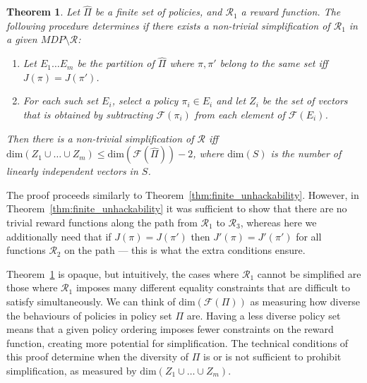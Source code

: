 \documentclass{article}
\newtheorem{theorem}{Theorem}
\theoremstyle{definition}
\theoremstyle{remark}
\begin{document}
\begin{theorem}\label{thm:finite_simplification}
Let $\hat{\Pi}$ be a finite set of policies, and $\mathcal{R}_1$ a reward function. The following procedure determines if there exists a non-trivial simplification of $\mathcal{R}_1$ in a given $MDP \setminus \mathcal{R}$:
\begin{enumerate}
    \item Let $E_1 \dots E_m$ be the partition of $\hat{\Pi}$ where $\pi,\pi'$ belong to the same set iff $J(\pi) = J(\pi')$.
    \item For each such set $E_i$, select a policy $\pi_i \in E_i$ and let $Z_i$ be the set of vectors that is obtained by subtracting $\mathcal{F}(\pi_i)$ from each element of $\mathcal{F}(E_i)$.
\end{enumerate}
Then there is a non-trivial simplification of $\mathcal{R}$ iff $\mathrm{dim}(Z_1 \cup \dots \cup Z_m) \leq \mathrm{dim}(\mathcal{F}(\hat{\Pi})) - 2$, where $\mathrm{dim}(S)$ is the number of linearly independent vectors in $S$.
\end{theorem}



The proof proceeds similarly to Theorem~\ref{thm:finite_unhackability}. However, in Theorem~\ref{thm:finite_unhackability} it was sufficient to show that there are no trivial reward functions along the path from $\mathcal{R}_1$ to $\mathcal{R}_3$, whereas here we additionally need that if $J(\pi) = J(\pi')$ then $J'(\pi) = J'(\pi')$ for all functions $\mathcal{R}_2$ on the path --- this is what the extra conditions ensure. 

Theorem~\ref{thm:finite_simplification} is opaque, but intuitively, the cases where $\mathcal{R}_1$ cannot be simplified are those where $\mathcal{R}_1$ imposes many different equality constraints that are difficult to satisfy simultaneously. 
We can think of $\mathrm{dim}(\mathcal{F}(\Pi))$ as measuring how diverse the behaviours of policies in policy set $\Pi$ are. 
Having a less diverse policy set means that a given policy ordering imposes fewer constraints on the reward function, creating more potential for simplification.
The technical conditions of this proof determine when the diversity of $\Pi$ is or is not sufficient to prohibit simplification, as measured by $\mathrm{dim}(Z_1 \cup \dots \cup Z_m)$.
\end{document}
